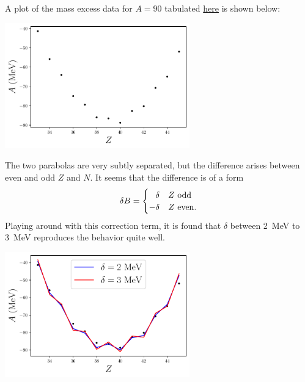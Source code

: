 A plot of the mass excess data for $A = 90$ tabulated \href{https://wwwndc.jaea.go.jp/NuC/index.html}{here} is shown below:
\begin{center}
    \includegraphics[width=0.6\textwidth]{prob6-5.pdf}
\end{center}
The two parabolas are very subtly separated, but the difference arises between even and odd $Z$ and $N$.
It seems that the difference is of a form
\begin{eqnarray}
    \delta B = \begin{cases}
        \phantom{-}\delta & Z~{\rm odd} \\
        -\delta & Z~{\rm even}
    .\end{cases}
\end{eqnarray}
Playing around with this correction term, it is found that $\delta$ between \SI{2}{\MeV} to \SI{3}{\MeV} reproduces the behavior quite well.
\begin{center}
    \includegraphics[width=0.6\textwidth]{prob6-5(1).pdf}
\end{center}


